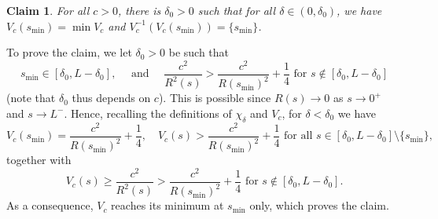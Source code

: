 \documentclass[11pt]{article}
\numberwithin{equation}{section}
\newtheorem*{claim}{Claim}
\theoremstyle{definition}
\newcommand{\ce}{c}
\begin{document}
\begin{claim}
For all $\ce>0$, there is $\delta_0>0$ such that for all $\delta \in (0,\delta_0)$, we have $V_\ce(s_{\min})= \min V_\ce$ and $V_\ce^{-1}(V_\ce(s_{\min})) = \{ s_{\min}\}$.
\end{claim}

To prove the claim, we let $\delta_0>0$ be such that
\[
s_{\min} \in [\delta_0, L-\delta_0], \quad \text{ and }
\quad \frac{\ce^2}{R^2(s)} > \frac{\ce^2}{R(s_{\min})^2} +\frac14 \text{ for } s \notin [\delta_0, L-\delta_0]
\]
(note that $\delta_0$ thus depends on $\ce$).
This is possible since $R(s)\to 0$ as $s\to 0^+$ and $s\to L^-$.
Hence, recalling the definitions of $\chi_\delta$ and $V_\ce$, for $\delta < \delta_0$ we have
\[
V_\ce(s_{\min})= \frac{\ce^2}{R(s_{\min})^2} + \frac14, \quad V_\ce(s) > \frac{\ce^2}{R(s_{\min})^2} + \frac14 \text{ for all }s \in [\delta_0, L-\delta_0] \setminus \{s_{\min}\},
\]
together with
\[
V_\ce(s) \geq \frac{\ce^2}{R^2(s)} > \frac{\ce^2}{R(s_{\min})^2} + \frac14 \text{ for }s \notin [\delta_0, L-\delta_0].
\]
As a consequence, $V_\ce$ reaches its minimum at $s_{\min}$ only, which proves the claim.
\end{document}
